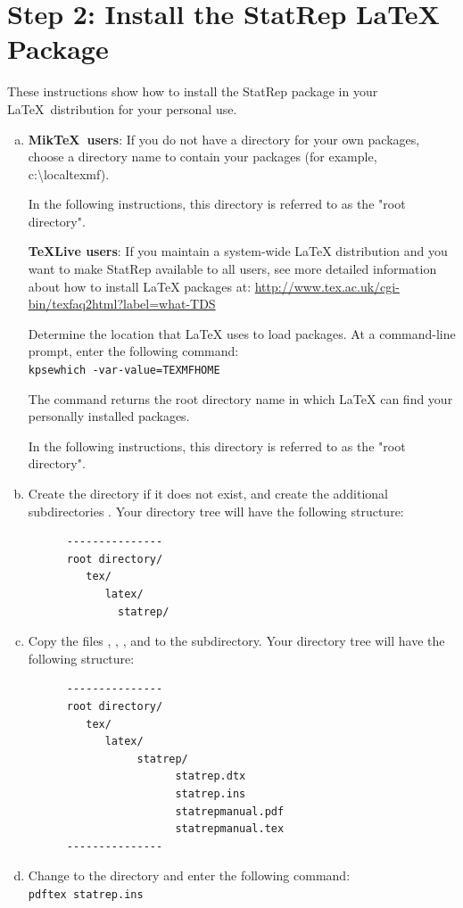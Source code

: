 \documentclass[article,oneside]{memoir}
\begin{document}
\section{Step 2: Install the StatRep LaTeX Package}

   These instructions show how to install the StatRep package
   in your \LaTeX\ distribution for your personal use.

  \begin{enumerate}[a)]
   \item
   \textbf{Mik\TeX\ users}: If you do not have a directory for your own
   packages, choose a directory name to contain your packages
   (for example, c:\textbackslash{}localtexmf).

   In the following instructions, this directory is referred to as the
   "root directory".

   \textbf{\TeX{}Live users}:
   If you maintain a system-wide LaTeX distribution and you want to
      make StatRep available to all users, see more detailed information
      about how to install LaTeX packages at:
      \url{http://www.tex.ac.uk/cgi-bin/texfaq2html?label=what-TDS}

   Determine the location that LaTeX uses to load packages. At a
   command-line prompt, enter the following command:\\
   \texttt{kpsewhich -var-value=TEXMFHOME}

   The command returns the root directory name in which LaTeX can
   find your personally installed packages.

    In the following instructions, this directory is referred to as the
    "root directory".

   \item
   Create the directory if it does not exist, and create the additional
   subdirectories .
   Your directory tree will have the following structure:
\begin{verbatim}
      ---------------
      root directory/
         tex/
            latex/
              statrep/
\end{verbatim}
  \item
   Copy the files , , ,
   and  to
   the  subdirectory. Your directory tree will have the following structure:
\begin{verbatim}
      ---------------
      root directory/
         tex/
            latex/
                 statrep/
                       statrep.dtx
                       statrep.ins
                       statrepmanual.pdf
                       statrepmanual.tex
      ---------------
\end{verbatim}
   \item
   Change to the  directory and enter the following command:\\
   \texttt{pdftex statrep.ins}


\end{enumerate}
\end{document}
